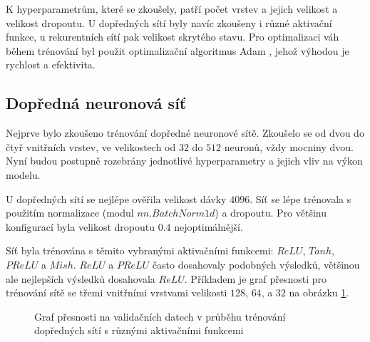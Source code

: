 K hyperparametrům, které se zkoušely, patří počet vrstev a jejich velikost a
velikost dropoutu. U dopředných sítí byly navíc zkoušeny i různé aktivační
funkce, u rekurentních sítí pak velikost skrytého stavu. Pro optimalizaci váh
během trénování byl použit optimalizační algoritmus Adam \cite{adam}, jehož
výhodou je rychlost a efektivita.

\subsection{Dopředná neuronová síť}

Nejprve bylo zkoušeno trénování dopředné neuronové sítě. Zkoušelo se od dvou do
čtyř vnitřních vrstev, ve velikostech od $32$ do $512$ neuronů, vždy mocniny
dvou. Nyní budou postupně rozebrány jednotlivé hyperparametry a jejich vliv na
výkon modelu.

U dopředných sítí se nejlépe ověřila velikost dávky $4096$. Síť se lépe
trénovala s použitím normalizace (modul $nn.BatchNorm1d$) a dropoutu. Pro
většinu konfigurací byla velikost dropoutu $0.4$ nejoptimálnější.

Síť byla trénována s těmito vybranými aktivačními funkcemi: $ReLU$, $Tanh$,
$PReLU$ a $Mish$. $ReLU$ a $PReLU$ často dosahovaly podobných výsledků,
většinou ale nejlepších výsledků dosahovala $ReLU$. Příkladem je graf přesnosti
pro trénování sítě se třemi vnitřními vrstvami velikosti $128$, $64$, a $32$ na
obrázku \ref{graph:fnnactivations}.

\begin{figure}[]
    \centering
    \caption{Graf přesnosti na validačních datech v průběhu trénování dopředných sítí s různými aktivačními funkcemi}
    \label{graph:fnnactivations}
\end{figure}

